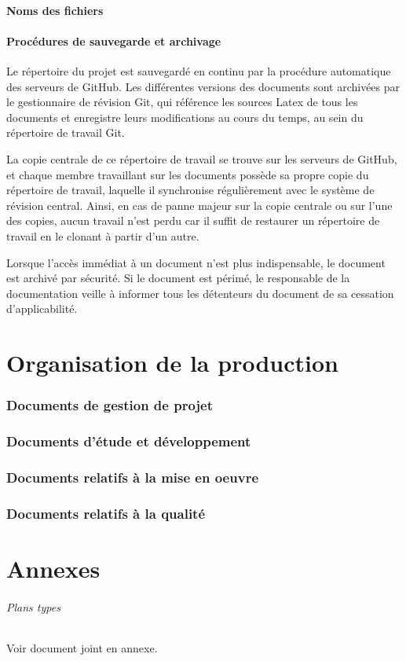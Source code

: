 \documentclass[a4paper]{article}
\begin{document}
\subsection{Noms des fichiers}
\subsection{Procédures de sauvegarde et archivage}

Le répertoire du projet est sauvegardé en continu par la procédure automatique des serveurs de GitHub. Les différentes versions des documents sont archivées par le gestionnaire de révision Git, qui référence les sources Latex de tous les documents et enregistre leurs modifications au cours du temps, au sein du répertoire de travail Git.

La copie centrale de ce répertoire de travail se trouve sur les serveurs de GitHub, et chaque membre travaillant sur les documents possède sa propre copie du répertoire de travail, laquelle il synchronise régulièrement avec le système de révision central. Ainsi, en cas de panne majeur sur la copie centrale ou sur l'une des copies, aucun travail n'est perdu car il suffit de restaurer un répertoire de travail en le clonant à partir d'un autre.

Lorsque l'accès immédiat à un document n'est plus indispensable, le document est archivé par sécurité. Si le document est périmé, le responsable de la documentation veille à informer tous les détenteurs du document de sa cessation d'applicabilité.

\part{Organisation de la production}

\section{Documents de gestion de projet}
\section{Documents d’étude et développement}
\section{Documents relatifs à la mise en oeuvre}
\section{Documents relatifs à la qualité}

\part{Annexes}

\paragraph{Plans types} Voir document joint en annexe.

\end{document}
